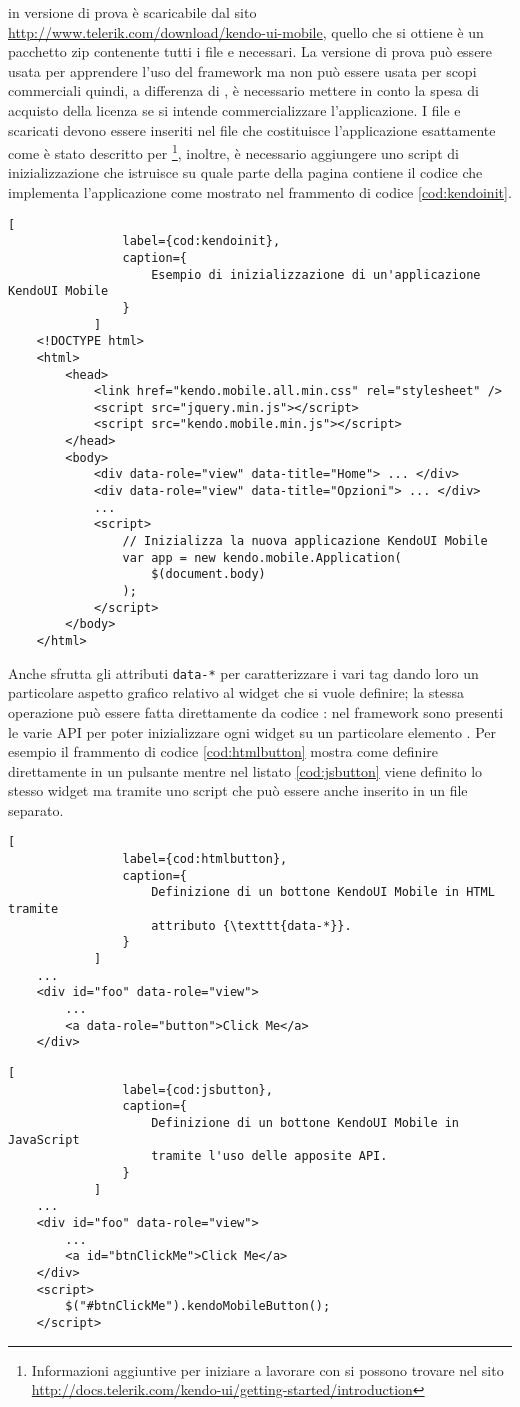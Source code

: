 			\kendomob{} in versione di prova è scaricabile dal sito 
			\url{http://www.telerik.com/download/kendo-ui-mobile}, quello che si 
			ottiene è un pacchetto zip contenente tutti i file \js{} e \css{} 
			necessari. La versione di prova	può essere usata per apprendere
			l'uso del framework ma non può essere usata per scopi commerciali 
			quindi, a differenza di \jqm{}, è necessario	mettere in conto
			la spesa di acquisto della licenza se si intende commercializzare
			l'applicazione.	I file \js{} e \css{} scaricati devono essere
			inseriti nel file \html{} che costituisce l'applicazione esattamente
			come è stato descritto per \jqm{}\footnote{Informazioni
			aggiuntive per iniziare a lavorare con \kendomob{} si possono
			trovare nel sito \url{http://docs.telerik.com/kendo-ui/getting-started/introduction}},
			inoltre, è necessario aggiungere uno script di inizializzazione che
			istruisce \kendomob{} su quale parte della pagina \html{} contiene il
			codice che implementa l'applicazione come mostrato nel frammento di
			codice \ref{cod:kendoinit}.
			\begin{lstlisting}[
				label={cod:kendoinit},
				caption={
					Esempio di inizializzazione di un'applicazione KendoUI Mobile
				}
			]
	<!DOCTYPE html>
	<html>
		<head>
			<link href="kendo.mobile.all.min.css" rel="stylesheet" />
			<script src="jquery.min.js"></script>
			<script src="kendo.mobile.min.js"></script>
		</head>
		<body>
			<div data-role="view" data-title="Home"> ... </div>
			<div data-role="view" data-title="Opzioni"> ... </div>
			...
			<script>
				// Inizializza la nuova applicazione KendoUI Mobile
				var app = new kendo.mobile.Application(
					$(document.body)
				);
			</script>
		</body>
	</html>
			\end{lstlisting} 
			Anche \kendomob{} sfrutta gli attributi \verb|data-*| per
			caratterizzare i vari tag \html{} dando loro un particolare aspetto
			grafico relativo al widget che si vuole definire; la stessa
			operazione può essere fatta direttamente da codice \js{}: nel
			framework sono presenti le varie API per poter inizializzare ogni
			widget su un particolare elemento \html{}. Per esempio il frammento di
			codice \ref{cod:htmlbutton} mostra come definire direttamente in
			\html{} un pulsante \kendomob{} mentre nel listato \ref{cod:jsbutton}
			viene definito lo stesso widget ma tramite uno script \js{} che
			può essere anche inserito in un file separato.
			\begin{lstlisting}[
				label={cod:htmlbutton},
				caption={
					Definizione di un bottone KendoUI Mobile in HTML tramite
					attributo {\texttt{data-*}}.
				}
			]
	...
	<div id="foo" data-role="view">
		...
		<a data-role="button">Click Me</a>
	</div>
			\end{lstlisting}
			\begin{lstlisting}[
				label={cod:jsbutton},
				caption={
					Definizione di un bottone KendoUI Mobile in JavaScript
					tramite l'uso delle apposite API.
				}
			]
	...
	<div id="foo" data-role="view">
		...
		<a id="btnClickMe">Click Me</a>
	</div>
	<script>
		$("#btnClickMe").kendoMobileButton();
	</script>
			\end{lstlisting}
			
